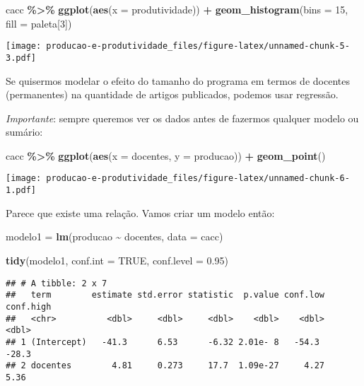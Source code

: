 \documentclass[
]{article}
\newenvironment{Shaded}{\begin{snugshade}}{\end{snugshade}}
\newcommand{\AttributeTok}[1]{\textcolor[rgb]{0.13,0.29,0.53}{#1}}
\newcommand{\ConstantTok}[1]{\textcolor[rgb]{0.56,0.35,0.01}{#1}}
\newcommand{\DecValTok}[1]{\textcolor[rgb]{0.00,0.00,0.81}{#1}}
\newcommand{\FloatTok}[1]{\textcolor[rgb]{0.00,0.00,0.81}{#1}}
\newcommand{\FunctionTok}[1]{\textcolor[rgb]{0.13,0.29,0.53}{\textbf{#1}}}
\newcommand{\NormalTok}[1]{#1}
\newcommand{\OtherTok}[1]{\textcolor[rgb]{0.56,0.35,0.01}{#1}}
\newcommand{\SpecialCharTok}[1]{\textcolor[rgb]{0.81,0.36,0.00}{\textbf{#1}}}
\begin{document}
\begin{Shaded}
\begin{Highlighting}[]
\NormalTok{cacc }\SpecialCharTok{\%\textgreater{}\%} 
  \FunctionTok{ggplot}\NormalTok{(}\FunctionTok{aes}\NormalTok{(}\AttributeTok{x =}\NormalTok{ produtividade)) }\SpecialCharTok{+} 
  \FunctionTok{geom\_histogram}\NormalTok{(}\AttributeTok{bins =} \DecValTok{15}\NormalTok{, }\AttributeTok{fill =}\NormalTok{ paleta[}\DecValTok{3}\NormalTok{])}
\end{Highlighting}
\end{Shaded}

\texttt{[image: producao-e-produtividade\_files/figure-latex/unnamed-chunk-5-3.pdf]}

Se quisermos modelar o efeito do tamanho do programa em termos de
docentes (permanentes) na quantidade de artigos publicados, podemos usar
regressão.

\emph{Importante}: sempre queremos ver os dados antes de fazermos
qualquer modelo ou sumário:

\begin{Shaded}
\begin{Highlighting}[]
\NormalTok{cacc }\SpecialCharTok{\%\textgreater{}\%} 
  \FunctionTok{ggplot}\NormalTok{(}\FunctionTok{aes}\NormalTok{(}\AttributeTok{x =}\NormalTok{ docentes, }\AttributeTok{y =}\NormalTok{ producao)) }\SpecialCharTok{+} 
  \FunctionTok{geom\_point}\NormalTok{()}
\end{Highlighting}
\end{Shaded}

\texttt{[image: producao-e-produtividade\_files/figure-latex/unnamed-chunk-6-1.pdf]}

Parece que existe uma relação. Vamos criar um modelo então:

\begin{Shaded}
\begin{Highlighting}[]
\NormalTok{modelo1 }\OtherTok{=} \FunctionTok{lm}\NormalTok{(producao }\SpecialCharTok{\textasciitilde{}}\NormalTok{ docentes, }\AttributeTok{data =}\NormalTok{ cacc)}

\FunctionTok{tidy}\NormalTok{(modelo1, }\AttributeTok{conf.int =} \ConstantTok{TRUE}\NormalTok{, }\AttributeTok{conf.level =} \FloatTok{0.95}\NormalTok{)}
\end{Highlighting}
\end{Shaded}

\begin{verbatim}
## # A tibble: 2 x 7
##   term        estimate std.error statistic  p.value conf.low conf.high
##   <chr>          <dbl>     <dbl>     <dbl>    <dbl>    <dbl>     <dbl>
## 1 (Intercept)   -41.3      6.53      -6.32 2.01e- 8   -54.3     -28.3 
## 2 docentes        4.81     0.273     17.7  1.09e-27     4.27      5.36
\end{verbatim}
\end{document}
